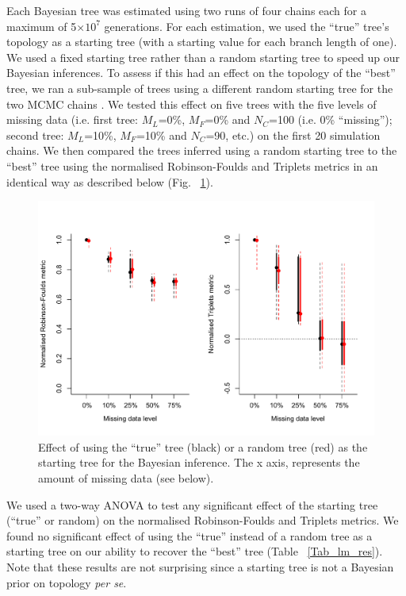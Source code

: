 Each Bayesian tree was estimated using two runs of four chains each for a maximum of 5$\times$$10^7$ generations.
For each estimation, we used the ``true'' tree's topology as a starting tree (with a starting value for each branch length of one).
We used a fixed starting tree rather than a random starting tree \citep[default MrBayes;][]{Ronquist2012mrbayes} to speed up our Bayesian inferences.
To assess if this had an effect on the topology of the ``best'' tree, we ran a sub-sample of trees using a different random starting tree for the two MCMC chains \citep[default MrBayes option;][]{Ronquist2012mrbayes}.
We tested this effect on five trees with the five levels of missing data (i.e. first tree: $M_L$=0\%, $M_F$=0\% and $N_C$=100 (i.e. 0\% ``missing''); second tree: $M_L$=10\%, $M_F$=10\% and $N_C$=90, etc.) on the first 20 simulation chains.
We then compared the trees inferred using a random starting tree to the ``best'' tree using the normalised Robinson-Foulds and Triplets metrics in an identical way as described below (Fig. ~\ref{Fig_startingTree}).

\begin{figure}[!h] %
\centering
\includegraphics[keepaspectratio=true, width=\textwidth]{TEM/Figures/Starting_tree.pdf}
\caption[Effect of using the ``true'' tree as a starting tree]{Effect of using the ``true'' tree (black) or a random tree (red) as the starting tree for the Bayesian inference. The x axis, represents the amount of missing data (see below).}
\label{Fig_startingTree}
\end{figure}

We used a two-way ANOVA to test any significant effect of the starting tree (``true'' or random) on the normalised Robinson-Foulds and Triplets metrics.
We found no significant effect of using the ``true'' instead of a random tree as a starting tree on our ability to recover the ``best'' tree (Table ~\ref{Tab_lm_res}).
Note that these results are not surprising since a starting tree is not a Bayesian prior on topology \textit{per se}.


